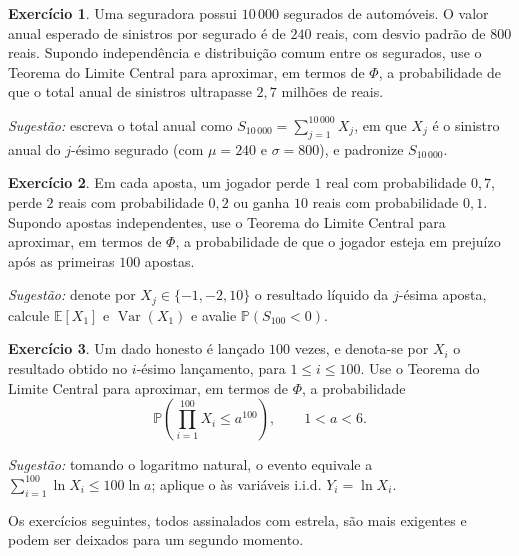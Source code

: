 \documentclass[12pt,portuguese]{article}
\theoremstyle{definition}
\theoremstyle{plainexercise}
\newtheorem{exercise}{Exercício}
\theoremstyle{starredexercise}
\theoremstyle{definition}
\begin{document}
\begin{exercise}\label{exercise:ross-8-15}
Uma seguradora possui $10\,000$ segurados de automóveis. O valor anual esperado
de sinistros por segurado é de $240$ reais, com desvio padrão de $800$ reais.
Supondo independência e distribuição comum entre os segurados, use o Teorema do
Limite Central para aproximar, em termos de $\Phi$, a probabilidade de que o
total anual de sinistros ultrapasse $2{,}7$ milhões de reais.

\noindent\emph{Sugestão:} escreva o total anual como
$S_{10\,000}=\sum_{j=1}^{10\,000}X_j$, em que $X_j$ é o sinistro anual do
$j$-ésimo segurado (com $\mu=240$ e $\sigma=800$), e padronize $S_{10\,000}$.
\end{exercise}

\begin{exercise}\label{exercise:ross-st-8-8}
Em cada aposta, um jogador perde $1$ real com probabilidade $0{,}7$, perde $2$
reais com probabilidade $0{,}2$ ou ganha $10$ reais com probabilidade $0{,}1$.
Supondo apostas independentes, use o Teorema do Limite Central para aproximar,
em termos de $\Phi$, a probabilidade de que o jogador esteja em prejuízo após as
primeiras $100$ apostas.

\noindent\emph{Sugestão:} denote por $X_j\in\{-1,-2,10\}$ o resultado líquido da
$j$-ésima aposta, calcule $\mathbb{E}[X_1]$ e $\operatorname{Var}(X_1)$ e
avalie $\mathbb{P}(S_{100}<0)$.
\end{exercise}

\begin{exercise}\label{exercise:ross-teor-8-7}
Um dado honesto é lançado $100$ vezes, e denota-se por $X_i$ o resultado obtido
no $i$-ésimo lançamento, para $1\leqslant i\leqslant100$. Use o Teorema do
Limite Central para aproximar, em termos de $\Phi$, a probabilidade
\[
  \mathbb{P}\left(\prod_{i=1}^{100} X_i\leqslant a^{100}\right),
  \qquad 1<a<6.
\]

\noindent\emph{Sugestão:} tomando o logaritmo natural, o evento equivale a
$\sum_{i=1}^{100}\ln X_i\leqslant100\ln a$; aplique o  às
variáveis i.i.d. $Y_i=\ln X_i$.
\end{exercise}

\medskip

Os exercícios seguintes, todos assinalados com estrela, são mais exigentes e
podem ser deixados para um segundo momento.
\end{document}
